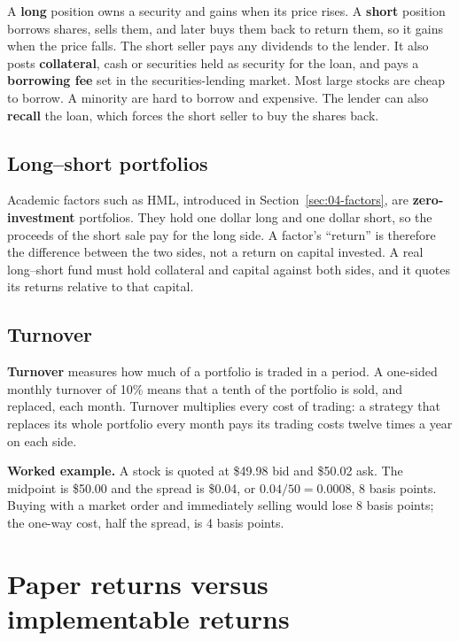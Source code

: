 A \textbf{long} position owns a security and gains when its price rises. A \textbf{short} position borrows shares, sells them, and later buys them back to return them, so it gains when the price falls. The short seller pays any dividends to the lender. It also posts \textbf{collateral}, cash or securities held as security for the loan, and pays a \textbf{borrowing fee} set in the securities-lending market. Most large stocks are cheap to borrow. A minority are hard to borrow and expensive. The lender can also \textbf{recall} the loan, which forces the short seller to buy the shares back.

\subsection{Long--short portfolios}

Academic factors such as HML, introduced in Section~\ref{sec:04-factors}, are \textbf{zero-investment} portfolios. They hold one dollar long and one dollar short, so the proceeds of the short sale pay for the long side. A factor's ``return'' is therefore the difference between the two sides, not a return on capital invested. A real long--short fund must hold collateral and capital against both sides, and it quotes its returns relative to that capital.

\subsection{Turnover}

\textbf{Turnover} measures how much of a portfolio is traded in a period. A one-sided monthly turnover of 10\% means that a tenth of the portfolio is sold, and replaced, each month. Turnover multiplies every cost of trading: a strategy that replaces its whole portfolio every month pays its trading costs twelve times a year on each side.

\textbf{Worked example.} A stock is quoted at \$49.98 bid and \$50.02 ask. The midpoint is \$50.00 and the spread is \$0.04, or $0.04/50 = 0.0008$, 8 basis points. Buying with a market order and immediately selling would lose 8 basis points; the one-way cost, half the spread, is 4 basis points.


\section{Paper returns versus implementable returns}
\label{sec:17-paper}

